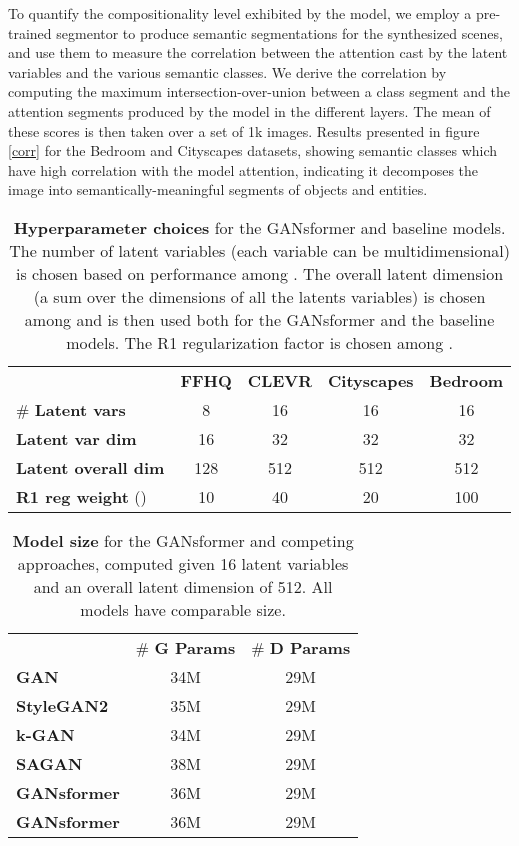 \documentclass{article}
\begin{document}
To quantify the compositionality level exhibited by the model, we employ a pre-trained segmentor to produce semantic segmentations for the synthesized scenes, and use them to measure the correlation between the attention cast by the latent variables and the various semantic classes. We derive the correlation by computing the maximum intersection-over-union between a class segment and the attention segments produced by the model in the different layers. The mean of these scores is then taken over a set of 1k images. Results presented in figure \ref{corr} for the Bedroom and Cityscapes datasets, showing semantic classes which have high correlation with the model attention, indicating it decomposes the image into semantically-meaningful segments of objects and entities.

\begin{table}[ht]
\caption{\textbf{Hyperparameter choices} for the GANsformer and baseline models. The number of latent variables (each variable can be multidimensional) is chosen based on performance among . The overall latent dimension (a sum over the dimensions of all the latents variables) is chosen among  and is then used both for the GANsformer and the baseline models. The R1 regularization factor  is chosen among .}
\vspace*{8pt}
\label{hyperparams}
\centering
\scriptsize
\begin{tabular}{lcccc}
\rowcolor{Blue1}
& \textbf{FFHQ} & \textbf{CLEVR} & \textbf{Cityscapes} & \textbf{Bedroom} \\
\scriptsize \# \textbf{Latent vars} & 8 & 16 & 16 & 16 \\
\rowcolor{Blue2}
\scriptsize \textbf{Latent var dim} & 16 & 32 & 32 & 32 \\
\scriptsize \textbf{Latent overall dim} & 128 & 512 & 512 & 512 \\
\rowcolor{Blue2}
\scriptsize \textbf{R1 reg weight} () & 10 & 40 & 20 & 100 \\
\end{tabular}
\end{table}

\begin{table}[ht]
\caption{\textbf{Model size} for the GANsformer and competing approaches, computed given 16 latent variables and an overall latent dimension of 512. All models have comparable size.}
\vspace*{8pt}
\label{paramsnum}
\centering
\scriptsize
\begin{tabular}{lcc}
\rowcolor{Blue1}
 & \# \textbf{G Params} & \# \textbf{D Params} \\
\scriptsize \textbf{GAN} & 34M & 29M \\
\rowcolor{Blue2}
\scriptsize \textbf{StyleGAN2} & 35M  & 29M \\
\scriptsize \textbf{k-GAN} & 34M & 29M \\
\rowcolor{Blue2}
\scriptsize \textbf{SAGAN} & 38M & 29M \\
\scriptsize \textbf{GANsformer} & 36M & 29M \\
\rowcolor{Blue2}
\scriptsize \textbf{GANsformer} & 36M & 29M \\
\end{tabular}
\end{table}
\end{document}
